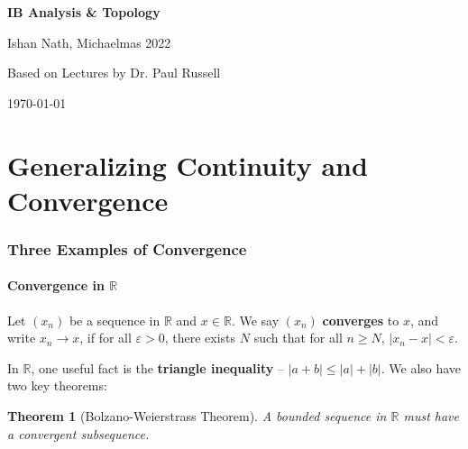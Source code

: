 \documentclass[12pt]{article}
\newtheorem{theorem}{Theorem}[section]
\theoremstyle{definition}
\theoremstyle{remark}
\begin{document}
\hypersetup{pageanchor=false}
\begin{titlepage}
	\begin{center}
		\vspace*{1em}
		\Huge
		\textbf{IB Analysis \& Topology}

		\vspace{1em}
		\large
		Ishan Nath, Michaelmas 2022

		\vspace{1.5em}

		\Large

		Based on Lectures by Dr. Paul Russell

		\vspace{1em}

		\large
		\today
	\end{center}
	
\end{titlepage}
\hypersetup{pageanchor=true}

\tableofcontents

\newpage

\part{Generalizing Continuity and Convergence}%
\label{prt:generalizing_continuity_and_convergence}

\section{Three Examples of Convergence}%
\label{sec:three_examples_of_convergence}

\subsection{Convergence in \texorpdfstring{$\mathbb{R}$}{R}}%
\label{sub:convergence_in_r_}

Let $(x_n)$ be a sequence in $\mathbb{R}$ and $x \in \mathbb{R}$. We say $(x_n)$ \textbf{converges} to $x$, and write $x_n \to x$, if for all $\varepsilon > 0$, there exists $N$ such that for all $n \geq N$, $|x_n - x| < \varepsilon$.

In $\mathbb{R}$, one useful fact is the \textbf{triangle inequality} -- $|a+b| \leq |a| + |b|$. We also have two key theorems:

\begin{theorem}[Bolzano-Weierstrass Theorem]
\item
	A bounded sequence in $\mathbb{R}$ must have a convergent subsequence.
\end{theorem}
\end{document}

